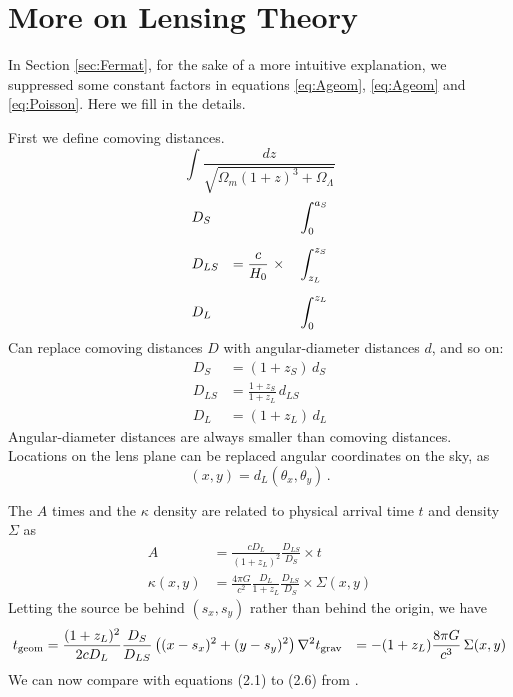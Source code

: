 \appendix

\section{More on Lensing Theory} \label{sec:more-theory}

In Section \ref{sec:Fermat}, for the sake of a more intuitive
explanation, we suppressed some constant factors in
equations \eqref{eq:Ageom}, \eqref{eq:Ageom} and \eqref{eq:Poisson}.
Here we fill in the details.

First we define comoving distances.
\begin{equation}
\int \frac{dz}{\sqrt{\Omega_m(1+z)^3 + \Omega_\Lambda}}
\end{equation}
\begin{equation}
\begin{aligned}
&D_S    &                                &\int_0^{a_S} \\
\noalign{\medskip}
&D_{LS} & = \frac c{H_0} \ \times \quad  &\int_{z_L}^{z_S} \\
\noalign{\medskip}
&D_L    &                                &\int_0^{z_L}
\end{aligned}
\end{equation}
Can replace comoving distances $D$ with angular-diameter distances
$d$, and so on:
\begin{equation}
\begin{aligned}
D_S &= (1+z_S) \, d_S \\
D_{LS} &= \frac{1+z_S}{1+z_L} \, d_{LS} \\
D_L &= (1+z_L) \, d_L
\end{aligned}
\end{equation}
Angular-diameter distances are always smaller than comoving distances.
Locations on the lens plane can be replaced angular coordinates on the
sky, as
\begin{equation}
(x,y) = d_L (\theta_x,\theta_y) \,.
\end{equation}

The $A$ times and the $\kappa$ density are related to physical arrival
time $t$ and density $\Sigma$ as
\begin{equation}
\begin{aligned}
A           &= \frac{cD_L}{(1+z_L)^2} \frac{D_{LS}}{D_S} \times t \\
\kappa(x,y) &= \frac{4\pi G}{c^2} \frac{D_L}{1+z_L} \frac{D_{LS}}{D_S}
               \times \Sigma(x,y)
\end{aligned}
\end{equation}
Letting the source be behind $(s_x,s_y)$ rather than behind the
origin, we have
\begin{equation}
\begin{aligned}
t_{\rm geom} &= \frac{(1+z_L)^2}{2cD_L} \frac{D_S}{D_{LS}}
\left( (x-s_x)^2 + (y-s_y)^2 \right)
\nabla^2 t_{\rm grav} &= -(1+z_L)\frac{8\pi G}{c^3} \, \Sigma(x,y)
\end{aligned}
\end{equation}
We can now compare with equations (2.1) to (2.6)
from \cite{1986ApJ...310..568B}.

